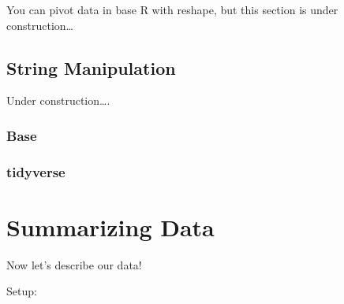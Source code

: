 \documentclass[
  letterpaper,
  DIV=11,
  numbers=noendperiod]{scrreprt}
\begin{document}
You can pivot data in base R with reshape, but this section is under
construction\ldots{}

\section{String Manipulation}\label{string-manipulation}

Under construction\ldots.

\subsection{Base}\label{base-2}

\subsection{tidyverse}\label{tidyverse-1}

\chapter{Summarizing Data}\label{summarizing-data}

Now let's describe our data!

Setup:
\end{document}

